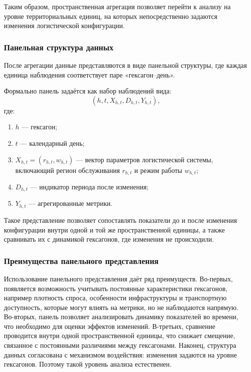 \documentclass[14pt,a4paper]{extarticle}
\begin{document}
Таким образом, пространственная агрегация позволяет перейти к анализу на уровне территориальных единиц, на которых непосредственно задаются изменения логистической конфигурации.

\subsubsection{Панельная структура данных}

После агрегации данные представляются в виде панельной структуры, где каждая единица наблюдения соответствует паре «гексагон--день».

Формально панель задаётся как набор наблюдений вида:
\[
(h,t,X_{h,t},D_{h,t},Y_{h,t}),
\]
где:
\begin{enumerate}
    \item \(h\) --- гексагон;
    \item \(t\) --- календарный день;
    \item \(X_{h,t}=(r_{h,t},w_{h,t})\) --- вектор параметров логистической системы, включающий регион обслуживания \(r_{h,t}\) и режим работы \(w_{h,t}\);
    \item \(D_{h,t}\) --- индикатор периода после изменения;
    \item \(Y_{h,t}\) --- агрегированные метрики.
\end{enumerate}

Такое представление позволяет сопоставлять показатели до и после изменения конфигурации внутри одной и той же пространственной единицы, а также сравнивать их с динамикой гексагонов, где изменения не происходили.

\subsubsection{Преимущества панельного представления}

Использование панельного представления даёт ряд преимуществ. Во-первых, появляется возможность учитывать постоянные характеристики гексагонов, например плотность спроса, особенности инфраструктуры и транспортную доступность, которые могут влиять на метрики, но не наблюдаются напрямую. Во-вторых, панель позволяет анализировать динамику показателей во времени, что необходимо для оценки эффектов изменений. В-третьих, сравнение проводится внутри одной пространственной единицы, что снижает смещение, связанное с постоянными различиями между гексагонами. Наконец, структура данных согласована с механизмом воздействия: изменения задаются на уровне гексагонов. Поэтому такой уровень анализа естественен.
\end{document}
